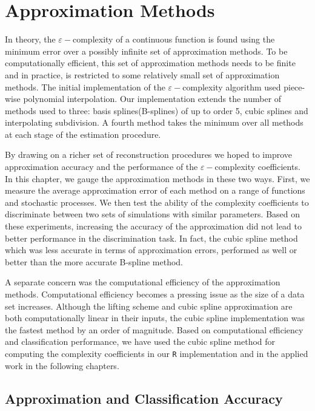 \chapter{Approximation Methods}

In theory, the $\varepsilon-$complexity of a continuous function is found using the minimum error over a possibly infinite set of approximation methods. To be computationally efficient, this set of approximation methods needs to be finite and in practice, is restricted to some relatively small set of approximation methods. The initial implementation of the $\varepsilon-$complexity algorithm used piece-wise polynomial interpolation. Our implementation extends the number of methods used to three: basis splines(B-splines) of up to order 5, 
cubic splines and interpolating subdivision. A fourth method takes
the minimum over all methods at each stage of the estimation 
procedure.

By drawing on a richer set of reconstruction procedures we hoped to improve approximation accuracy and the performance of the $\varepsilon-$complexity coefficients. In this chapter, we gauge the approximation methods in these two ways. First, we measure the average approximation error of each method on a range of functions and stochastic processes. We then test the 
ability of the complexity coefficients to discriminate between two sets of simulations with similar parameters. Based on these experiments, increasing the accuracy of the approximation did not lead to better performance in the discrimination task. In fact, the cubic spline method which was less accurate in terms of approximation errors, performed as well or better than the more accurate B-spline method.

A separate concern was the computational efficiency of the approximation methods. Computational efficiency becomes a pressing issue as the size of a data set increases. Although the lifting 
scheme and cubic spline approximation are both computationally linear 
in their inputs, the cubic spline implementation was the 
fastest method by an order of magnitude. 
 Based on computational efficiency and classification performance, we have used the cubic spline method for computing the complexity coefficients in our \texttt{R} implementation and in the applied work in the following chapters.

\section{Approximation and Classification Accuracy}

